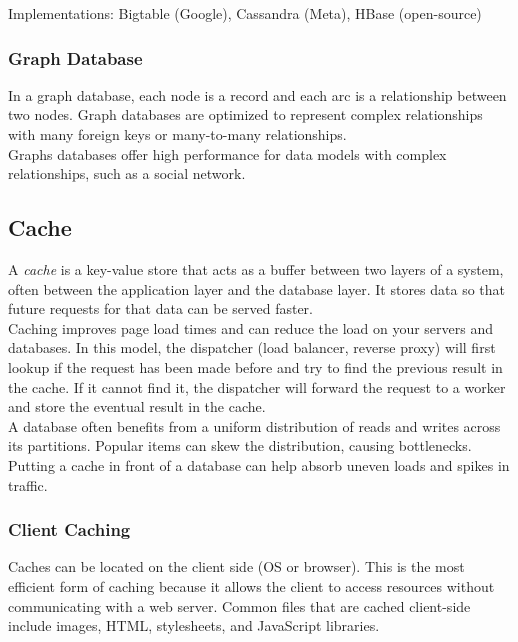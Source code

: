 \documentclass[12pt, titlepage]{article}
\begin{document}
Implementations: Bigtable (Google), Cassandra (Meta), HBase (open-source)

\subsubsection{Graph Database}

In a graph database, each node is a record and each arc is a relationship between two nodes. Graph databases are optimized to represent complex relationships with many foreign keys or many-to-many relationships. \\

Graphs databases offer high performance for data models with complex relationships, such as a social network.

\subsection{Cache}

A \textit{cache} is a key-value store that acts as a buffer between two layers of a system, often between the application layer and the database layer. It stores data so that future requests for that data can be served faster. \\

Caching improves page load times and can reduce the load on your servers and databases. In this model, the dispatcher (load balancer, reverse proxy) will first lookup if the request has been made before and try to find the previous result in the cache. If it cannot find it, the dispatcher will forward the request to a worker and store the eventual result in the cache. \\

A database often benefits from a uniform distribution of reads and writes across its partitions. Popular items can skew the distribution, causing bottlenecks. Putting a cache in front of a database can help absorb uneven loads and spikes in traffic. \\

\subsubsection{Client Caching}

Caches can be located on the client side (OS or browser). This is the most efficient form of caching because it allows the client to access resources without communicating with a web server. Common files that are cached client-side include images, HTML, stylesheets, and JavaScript libraries.
\end{document}
